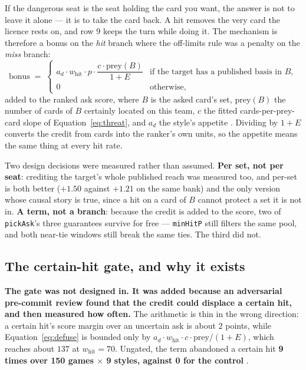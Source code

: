 \documentclass[11pt]{article}
\newcommand{\code}[1]{\texttt{#1}}
\begin{document}
If the dangerous seat is the seat holding the card you want, the answer is not to leave it alone ---
it is to take the card back. A hit removes the very card the licence rests on, and row 9 keeps the
turn while doing it. The mechanism is therefore a bonus on the \emph{hit} branch where the
off-limits rule was a penalty on the \emph{miss} branch:
\begin{equation}
\label{eq:defuse}
\text{bonus} \;=\;
\begin{cases}
a_{d} \cdot w_{\mathrm{hit}} \cdot p \cdot \dfrac{c \cdot \mathrm{prey}(B)}{1+E}
  & \text{if the target has a published basis in } B,\\[2ex]
0 & \text{otherwise,}
\end{cases}
\end{equation}
added to the ranked ask score, where $B$ is the asked card's set, $\mathrm{prey}(B)$ the number of
cards of $B$ certainly located on this team, $c$ the fitted cards-per-prey-card slope of
Equation~\eqref{eq:threat}, and $a_d$ the style's appetite \cite{repo}. Dividing by $1+E$ converts
the credit from cards into the ranker's own units, so the appetite means the same thing at every hit
rate.

Two design decisions were measured rather than assumed. \textbf{Per set, not per seat}: crediting
the target's whole published reach was measured too, and per-set is both better ($+1.50$ against
$+1.21$ on the same bank) and the only version whose causal story is true, since a hit on a card of
$B$ cannot protect a set it is not in. \textbf{A term, not a branch}: because the credit is added to
the score, two of \code{pickAsk}'s three guarantees survive for free --- \code{minHitP} still
filters the same pool, and both near-tie windows still break the same ties. The third did not.

\subsection{The certain-hit gate, and why it exists}
\label{sec:gate}

\textbf{The gate was not designed in. It was added because an adversarial pre-commit review found
that the credit could displace a certain hit, and then measured how often.} The arithmetic is thin
in the wrong direction: a certain hit's score margin over an uncertain ask is about $2$ points,
while Equation~\eqref{eq:defuse} is bounded only by $a_d \cdot w_{\mathrm{hit}} \cdot c \cdot
\mathrm{prey} / (1+E)$, which reaches about $137$ at $w_{\mathrm{hit}} = 70$. Ungated, the term
abandoned a certain hit \textbf{9 times over 150 games $\times$ 9 styles, against 0 for the control}
\cite{concession,repo}.
\end{document}
